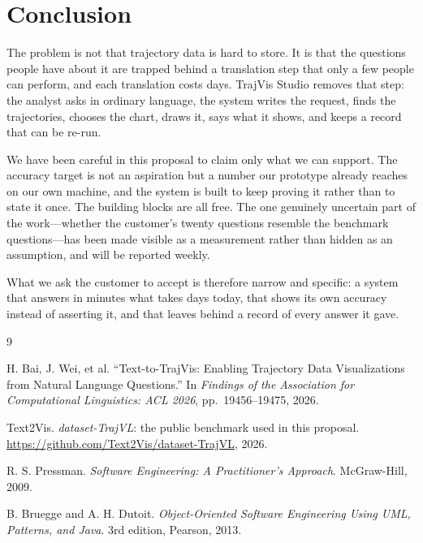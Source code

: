 \documentclass[12pt,a4paper]{report}
\begin{document}
\chapter{Conclusion}
\label{ch:concl}

The problem is not that trajectory data is hard to store. It is that the
questions people have about it are trapped behind a translation step that only a
few people can perform, and each translation costs days. TrajVis Studio removes
that step: the analyst asks in ordinary language, the system writes the request,
finds the trajectories, chooses the chart, draws it, says what it shows, and
keeps a record that can be re-run.

We have been careful in this proposal to claim only what we can support. The
accuracy target is not an aspiration but a number our prototype already reaches
on our own machine, and the system is built to keep proving it rather than to
state it once. The building blocks are all free. The one genuinely uncertain
part of the work---whether the customer's twenty questions resemble the
benchmark questions---has been made visible as a measurement rather than hidden
as an assumption, and will be reported weekly.

What we ask the customer to accept is therefore narrow and specific: a system
that answers in minutes what takes days today, that shows its own accuracy
instead of asserting it, and that leaves behind a record of every answer it
gave.

\begin{thebibliography}{9}
{}

H. Bai, J. Wei, et al. ``Text-to-TrajVis: Enabling Trajectory Data
Visualizations from Natural Language Questions.'' In \emph{Findings of the
Association for Computational Linguistics: ACL 2026}, pp.~19456--19475, 2026.

Text2Vis. \emph{dataset-TrajVL}: the public benchmark used in this proposal.
\url{https://github.com/Text2Vis/dataset-TrajVL}, 2026.

R. S. Pressman. \emph{Software Engineering: A Practitioner's Approach}.
McGraw-Hill, 2009.

B. Bruegge and A. H. Dutoit. \emph{Object-Oriented Software Engineering Using
UML, Patterns, and Java}. 3rd edition, Pearson, 2013.

\end{thebibliography}
\end{document}
